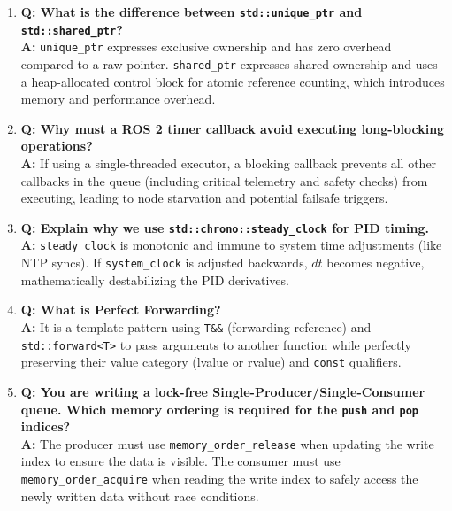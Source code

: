 \documentclass{article}
\begin{document}
\begin{enumerate}
    \item \textbf{Q: What is the difference between \texttt{std::unique\_ptr} and \texttt{std::shared\_ptr}?}\\
    \textbf{A:} \texttt{unique\_ptr} expresses exclusive ownership and has zero overhead compared to a raw pointer. \texttt{shared\_ptr} expresses shared ownership and uses a heap-allocated control block for atomic reference counting, which introduces memory and performance overhead.

    \item \textbf{Q: Why must a ROS 2 timer callback avoid executing long-blocking operations?}\\
    \textbf{A:} If using a single-threaded executor, a blocking callback prevents all other callbacks in the queue (including critical telemetry and safety checks) from executing, leading to node starvation and potential failsafe triggers.

    \item \textbf{Q: Explain why we use \texttt{std::chrono::steady\_clock} for PID timing.}\\
    \textbf{A:} \texttt{steady\_clock} is monotonic and immune to system time adjustments (like NTP syncs). If \texttt{system\_clock} is adjusted backwards, $dt$ becomes negative, mathematically destabilizing the PID derivatives.

    \item \textbf{Q: What is Perfect Forwarding?}\\
    \textbf{A:} It is a template pattern using \texttt{T\&\&} (forwarding reference) and \texttt{std::forward<T>} to pass arguments to another function while perfectly preserving their value category (lvalue or rvalue) and \texttt{const} qualifiers.

    \item \textbf{Q: You are writing a lock-free Single-Producer/Single-Consumer queue. Which memory ordering is required for the \texttt{push} and \texttt{pop} indices?}\\
    \textbf{A:} The producer must use \texttt{memory\_order\_release} when updating the write index to ensure the data is visible. The consumer must use \texttt{memory\_order\_acquire} when reading the write index to safely access the newly written data without race conditions.
\end{enumerate}
\end{document}
